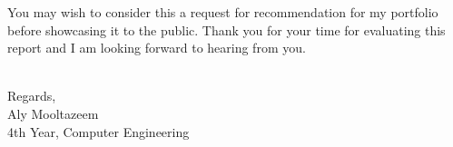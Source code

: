 \begin{flushleft}
You may wish to consider this a request for recommendation for my portfolio before
showcasing it to the public. Thank you for your time for evaluating this report
and I am looking forward to hearing from you.

\hspace{1.5em}%
\\[2em]

Regards, \\[2.5em]
Aly Mooltazeem \\
4th Year, Computer Engineering

\end{flushleft}